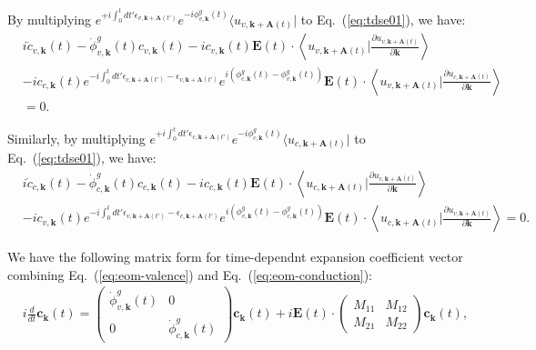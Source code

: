 By multiplying $e^{+i\int^t_0dt' \epsilon_{v,\mathbf k+ \mathbf A(t')}} e^{-i\phi^g_{v,\mathbf k}(t)} \langle u_{v,\mathbf k+\mathbf A(t)}|$ to Eq.~(\ref{eq:tdse01}), we have:
\begin{align}
	 & i \dot c_{v,\mathbf k}(t) - \dot \phi^g_{v,\mathbf k}(t) c_{v,\mathbf k}(t) - i c_{v,\mathbf k}(t) \mathbf E(t)\cdot \left \langle u_{v,\mathbf k+\mathbf A(t)}\Big |\frac{\partial u_{v,\mathbf k+\mathbf A(t)}}{\partial \mathbf k} \right \rangle \nonumber \\
	 & - i c_{c,\mathbf k}(t) e^{-i\int^t_0dt' \epsilon_{c,\mathbf k+ \mathbf A(t')}-\epsilon_{v,\mathbf k+ \mathbf A(t')}} e^{i\left (\phi^g_{c,\mathbf k}(t)-\phi^g_{v,\mathbf k}(t)\right )}
	\mathbf E(t)\cdot \left \langle u_{v,\mathbf k+\mathbf A(t)}\Big |\frac{\partial u_{c,\mathbf k+\mathbf
	A(t)}}{\partial \mathbf k} \right \rangle                                                                                                                                                                                                                         \\& = 0.
	\label{eq:eom-valence}
\end{align}

Similarly, by multiplying $e^{+i\int^t_0dt' \epsilon_{c,\mathbf k+ \mathbf A(t')}} e^{-i\phi^g_{c,\mathbf k}(t)} \langle u_{c,\mathbf k+\mathbf A(t)}|$ to Eq.~(\ref{eq:tdse01}), we have:
\begin{align}
	 & i \dot c_{c,\mathbf k}(t) - \dot \phi^g_{c,\mathbf k}(t) c_{c,\mathbf k}(t) - i c_{c,\mathbf k}(t) \mathbf E(t)\cdot \left \langle u_{c,\mathbf k+\mathbf A(t)}\Big |\frac{\partial u_{c,\mathbf k+\mathbf A(t)}}{\partial \mathbf k} \right \rangle \nonumber \\
	 & - i c_{v,\mathbf k}(t) e^{-i\int^t_0dt' \epsilon_{v,\mathbf k+ \mathbf A(t')}-\epsilon_{c,\mathbf k+ \mathbf A(t')}} e^{i\left (\phi^g_{v,\mathbf k}(t)-\phi^g_{c,\mathbf k}(t)\right )}
	\mathbf E(t)\cdot \left \langle u_{c,\mathbf k+\mathbf A(t)}\Big |\frac{\partial u_{v,\mathbf k+\mathbf A(t)}}{\partial \mathbf k} \right \rangle = 0.
	\label{eq:eom-conduction}
\end{align}

We have the following matrix form for time-dependnt expansion coefficient vector combining Eq.~(\ref{eq:eom-valence}) and Eq.~(\ref{eq:eom-conduction}):
\begin{align}
	 & i\frac{d}{dt} \mathbf c_{\mathbf k}(t) =
	\left(
	\begin{array}{cc}
			\dot \phi^g_{v,\mathbf k}(t) & 0                            \\
			0                            & \dot \phi^g_{c,\mathbf k}(t)
		\end{array}
	\right) \mathbf c_{\mathbf k}(t)
	+i\mathbf E(t)\cdot \left(
	\begin{array}{cc}
			M_{11} & M_{12} \\
			M_{21} & M_{22}
		\end{array}
	\right) \mathbf c_{\mathbf k}(t),
\end{align}

